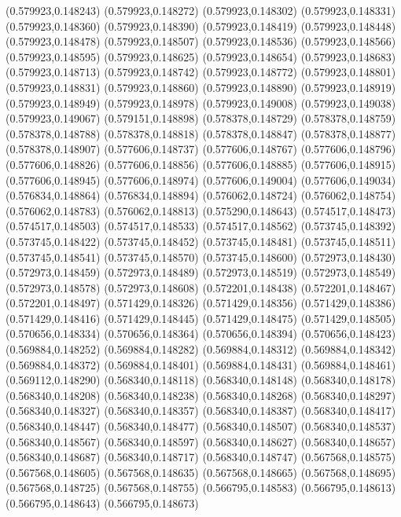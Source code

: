 (0.579923,0.148243)
(0.579923,0.148272)
(0.579923,0.148302)
(0.579923,0.148331)
(0.579923,0.148360)
(0.579923,0.148390)
(0.579923,0.148419)
(0.579923,0.148448)
(0.579923,0.148478)
(0.579923,0.148507)
(0.579923,0.148536)
(0.579923,0.148566)
(0.579923,0.148595)
(0.579923,0.148625)
(0.579923,0.148654)
(0.579923,0.148683)
(0.579923,0.148713)
(0.579923,0.148742)
(0.579923,0.148772)
(0.579923,0.148801)
(0.579923,0.148831)
(0.579923,0.148860)
(0.579923,0.148890)
(0.579923,0.148919)
(0.579923,0.148949)
(0.579923,0.148978)
(0.579923,0.149008)
(0.579923,0.149038)
(0.579923,0.149067)
(0.579151,0.148898)
(0.578378,0.148729)
(0.578378,0.148759)
(0.578378,0.148788)
(0.578378,0.148818)
(0.578378,0.148847)
(0.578378,0.148877)
(0.578378,0.148907)
(0.577606,0.148737)
(0.577606,0.148767)
(0.577606,0.148796)
(0.577606,0.148826)
(0.577606,0.148856)
(0.577606,0.148885)
(0.577606,0.148915)
(0.577606,0.148945)
(0.577606,0.148974)
(0.577606,0.149004)
(0.577606,0.149034)
(0.576834,0.148864)
(0.576834,0.148894)
(0.576062,0.148724)
(0.576062,0.148754)
(0.576062,0.148783)
(0.576062,0.148813)
(0.575290,0.148643)
(0.574517,0.148473)
(0.574517,0.148503)
(0.574517,0.148533)
(0.574517,0.148562)
(0.573745,0.148392)
(0.573745,0.148422)
(0.573745,0.148452)
(0.573745,0.148481)
(0.573745,0.148511)
(0.573745,0.148541)
(0.573745,0.148570)
(0.573745,0.148600)
(0.572973,0.148430)
(0.572973,0.148459)
(0.572973,0.148489)
(0.572973,0.148519)
(0.572973,0.148549)
(0.572973,0.148578)
(0.572973,0.148608)
(0.572201,0.148438)
(0.572201,0.148467)
(0.572201,0.148497)
(0.571429,0.148326)
(0.571429,0.148356)
(0.571429,0.148386)
(0.571429,0.148416)
(0.571429,0.148445)
(0.571429,0.148475)
(0.571429,0.148505)
(0.570656,0.148334)
(0.570656,0.148364)
(0.570656,0.148394)
(0.570656,0.148423)
(0.569884,0.148252)
(0.569884,0.148282)
(0.569884,0.148312)
(0.569884,0.148342)
(0.569884,0.148372)
(0.569884,0.148401)
(0.569884,0.148431)
(0.569884,0.148461)
(0.569112,0.148290)
(0.568340,0.148118)
(0.568340,0.148148)
(0.568340,0.148178)
(0.568340,0.148208)
(0.568340,0.148238)
(0.568340,0.148268)
(0.568340,0.148297)
(0.568340,0.148327)
(0.568340,0.148357)
(0.568340,0.148387)
(0.568340,0.148417)
(0.568340,0.148447)
(0.568340,0.148477)
(0.568340,0.148507)
(0.568340,0.148537)
(0.568340,0.148567)
(0.568340,0.148597)
(0.568340,0.148627)
(0.568340,0.148657)
(0.568340,0.148687)
(0.568340,0.148717)
(0.568340,0.148747)
(0.567568,0.148575)
(0.567568,0.148605)
(0.567568,0.148635)
(0.567568,0.148665)
(0.567568,0.148695)
(0.567568,0.148725)
(0.567568,0.148755)
(0.566795,0.148583)
(0.566795,0.148613)
(0.566795,0.148643)
(0.566795,0.148673)
